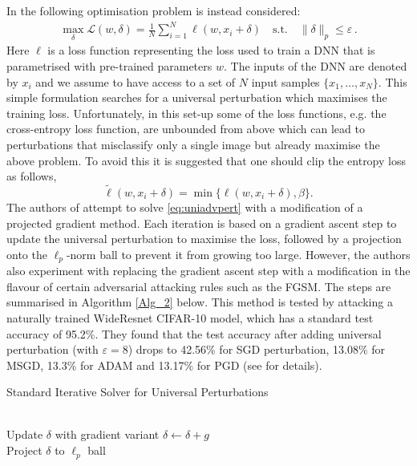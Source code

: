 \noindent In \cite{shafahi_universal_2018} the following optimisation problem is instead considered: 
\begin{align}
\max_{\delta} \mathcal{L} (w,\delta) = \frac{1}{N} \sum_{i=1}^N \ell(w,x_i + \delta) \quad \text{s.t.} \quad \| \delta \|_p \leq \varepsilon \, .\label{eq:uniadvpert}
\end{align}
Here $\ell$ is a loss function representing the loss used to train a DNN that is parametrised with pre-trained parameters $w$. The inputs of the DNN are denoted by $x_i$ and we assume to have access to a set of $N$ input samples $\{x_1, \ldots, x_N\}$. This simple formulation searches for a universal perturbation which maximises the training loss. Unfortunately, in this set-up some of the loss functions, e.g. the cross-entropy loss function, are unbounded from above which can lead to perturbations that misclassify only a single image but already maximise the above problem. To avoid this it is suggested that one should clip the entropy loss as follows, 
$$\tilde{\ell}(w,x_i + \delta) = \min \{ \ell(w,x_i+\delta), \beta \}.$$ 
The authors of \cite{shafahi_universal_2018} attempt to solve \eqref{eq:uniadvpert} with a modification of a projected gradient method. Each iteration is based on a gradient ascent step to update the universal perturbation to maximise the loss, followed by a projection onto the $\ell_p$-norm ball to prevent it from growing too large. However, the authors also experiment with replacing the gradient ascent step with a modification in the flavour of certain adversarial attacking rules such as the FGSM. The steps are summarised in Algorithm \ref{Alg_2} below. This method is tested by attacking a naturally trained WideResnet CIFAR-10 model, which has a standard test accuracy of 95.2\%. They found that the test accuracy after adding universal perturbation (with $\varepsilon =8$) drops to 42.56\% for SGD perturbation, 13.08\% for MSGD, 13.3\% for ADAM and 13.17\% for PGD (see \cite{shafahi_universal_2018} for details).
\begin{algorithm}
\caption{Standard Iterative Solver for Universal Perturbations}\label{Alg_2}
\begin{algorithmic}[1]



 \\
\hspace{\algorithmicindent} Update $\delta$ with gradient variant $\delta \gets \delta + g$ \\
\hspace{\algorithmicindent} Project $\delta$ to $\ell_p$ ball


\EndFor
\EndFor
\end{algorithmic}
\end{algorithm}

